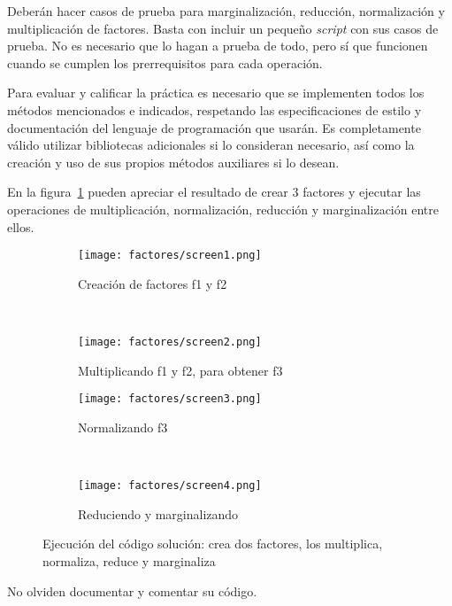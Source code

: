 Deberán hacer casos de prueba para marginalización, reducción, normalización y multiplicación de factores. Basta con incluir un pequeño \textit{script} con sus casos de prueba. No es necesario que lo hagan a prueba de todo, pero sí que funcionen cuando se cumplen los prerrequisitos para cada operación.

Para evaluar y calificar la práctica es necesario que se implementen todos los métodos mencionados e indicados, respetando las especificaciones de estilo y documentación del lenguaje de programación que usarán.
Es completamente válido utilizar bibliotecas adicionales si lo consideran necesario, así como la creación y uso de sus propios métodos auxiliares si lo desean.

En la figura~\ref{fig:P5solution} pueden apreciar el resultado de crear 3 factores y ejecutar las operaciones de multiplicación, normalización, reducción y marginalización entre ellos. 

\begin{figure}[H]
  \centering
  \begin{subfigure}[b]{.45\textwidth}
    \texttt{[image: factores/screen1.png]}
    \caption{Creación de factores f1 y f2}
  \end{subfigure}
  ~
  \begin{subfigure}[b]{.45\textwidth}
    \texttt{[image: factores/screen2.png]}
    \caption{Multiplicando f1 y f2, para obtener f3}
  \end{subfigure}


  \begin{subfigure}[b]{.45\textwidth}
    \texttt{[image: factores/screen3.png]}
    \caption{Normalizando f3}
  \end{subfigure}
  ~
  \begin{subfigure}[b]{.45\textwidth}
    \texttt{[image: factores/screen4.png]}
    \caption{Reduciendo y marginalizando}
  \end{subfigure}
  \caption{Ejecución del código solución: crea dos factores, los multiplica, normaliza, reduce y marginaliza}
  \label{fig:P5solution}
\end{figure}

No olviden documentar y comentar su código.
